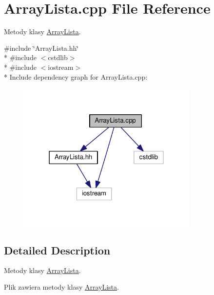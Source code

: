 \hypertarget{a00007}{}\section{Array\+Lista.\+cpp File Reference}
\label{a00007}


Metody klasy \hyperlink{a00001}{Array\+Lista}.  


{\ttfamily \#include \char`\"{}Array\+Lista.\+hh\char`\"{}}\\*
{\ttfamily \#include $<$cstdlib$>$}\\*
{\ttfamily \#include $<$iostream$>$}\\*
Include dependency graph for Array\+Lista.\+cpp\+:\nopagebreak
\begin{figure}[H]
\begin{center}
\leavevmode
\includegraphics[width=255pt]{a00022}
\end{center}
\end{figure}


\subsection{Detailed Description}
Metody klasy \hyperlink{a00001}{Array\+Lista}. 

Plik zawiera metody klasy \hyperlink{a00001}{Array\+Lista}. 